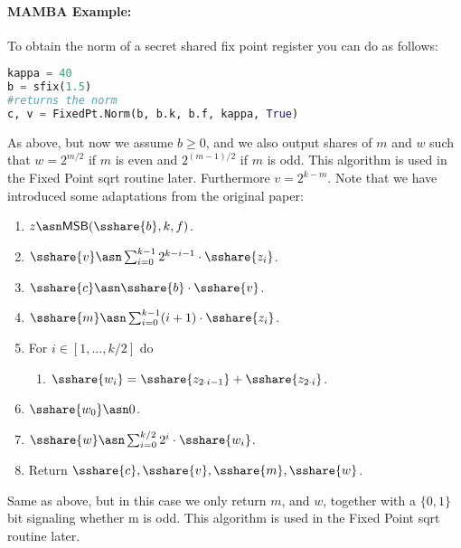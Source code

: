 \paragraph{MAMBA Example:} To obtain the norm of a secret shared fix point register you can do as follows:
\begin{lstlisting}[language={python}]
kappa = 40 
b = sfix(1.5)
#returns the norm
c, v = FixedPt.Norm(b, b.k, b.f, kappa, True)
\end{lstlisting}

As above, but now we assume $b \ge 0$, and we also
output shares of $m$ and $w$ such that $w=2^{m/2}$
if $m$ is even and $2^{(m-1)/2}$ if $m$ is odd. 
This algorithm is used in the Fixed Point sqrt routine later.
Furthermore $v = 2^{k-m}$. Note that we have introduced some adaptations from the original paper:
\begin{enumerate}
\item $z \asn \mathsf{MSB}(\sshare{b},k,f)$.
\item $\sshare{v} \asn \sum_{i=0}^{k-1} 2^{k-i-1} \cdot \sshare{z_i}$.
\item $\sshare{c} \asn \sshare{b} \cdot \sshare{v}$.
\item $\sshare{m} \asn \sum_{i=0}^{k-1} (i+1) \cdot \sshare{z_i}$. 
\item For $i \in [1,\ldots,k/2]$ do
\begin{enumerate}
	\item $\sshare{w_i}=\sshare{z_{2\cdot i-1}}+\sshare{z_{2\cdot i}}$.
\end{enumerate}
\item $\sshare{w_0} \asn 0$. 
\item $\sshare{w} \asn \sum_{i=0}^{k/2} 2^i \cdot \sshare{w_i}$.
\item Return $\sshare{c}, \sshare{v}, \sshare{m}, \sshare{w}$.
\end{enumerate}

Same as above, but in this case we only return $m$, and $w$, together with a $\{0,1\}$ bit signaling whether m is odd. 
This algorithm is used in the Fixed Point sqrt routine later.

